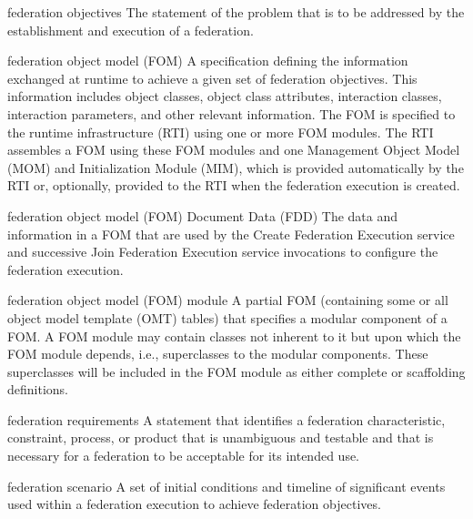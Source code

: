 \begin{definition}{federation objectives}
    The statement of the problem that is to be addressed by the establishment and execution of a federation.
\end{definition}


\newpage
\begin{definition}{federation object model (FOM)}
    A specification defining the information exchanged at runtime to achieve a given set of federation objectives. This information includes object classes, object class attributes, interaction classes, interaction parameters, and other relevant information. The FOM is specified to the runtime infrastructure (RTI) using one or more FOM modules. The RTI assembles a FOM using these FOM modules and one Management Object Model (MOM) and Initialization Module (MIM), which is provided automatically by the RTI or, optionally, provided to the RTI when the federation execution is created.
\end{definition}

\begin{definition}{federation object model (FOM) Document Data (FDD)}
    The data and information in a FOM that are used by the Create Federation Execution service and successive Join Federation Execution service invocations to configure the federation execution.
\end{definition}

\begin{definition}{federation object model (FOM) module}
    A partial FOM (containing some or all object model template (OMT) tables) that specifies a modular component of a FOM. A FOM module may contain classes not inherent to it but upon which the FOM module depends, i.e., superclasses to the modular components. These superclasses will be included in the FOM module as either complete or scaffolding definitions.
\end{definition}

\begin{definition}{federation requirements}
    A statement that identifies a federation characteristic, constraint, process, or product that is unambiguous and testable and that is necessary for a federation to be acceptable for its intended use.
\end{definition}

\begin{definition}{federation scenario}
    A set of initial conditions and timeline of significant events used within a federation execution to achieve federation objectives.
\end{definition}

